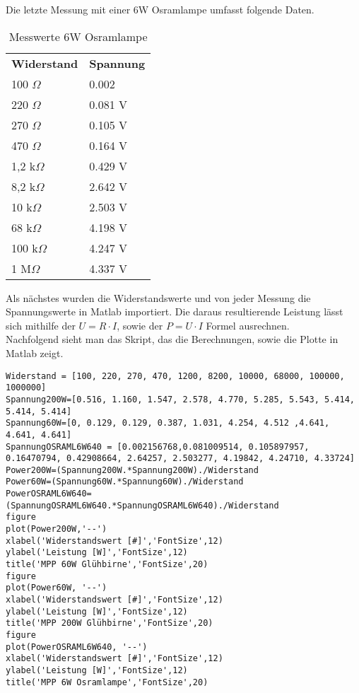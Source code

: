 Die letzte Messung mit einer 6W Osramlampe umfasst folgende Daten.
\begin{table}
\centering
\caption{Messwerte 6W Osramlampe}
\label{tab:Messwerte 6W Osramlampe}
\begin{tabular}{ll}
  \textbf{Widerstand} & \textbf{Spannung} \\
  100 $ \Omega $ & 0.002\\
  220 $ \Omega $ & 0.081 V\\
  270 $ \Omega $ & 0.105 V\\
  470 $ \Omega $ & 0.164 V\\
  1,2 k$ \Omega $ & 0.429 V\\
  8,2 k$ \Omega $ & 2.642 V \\
  10 k$ \Omega $ & 2.503 V \\
  68 k$ \Omega $ & 4.198 V \\
  100 k$ \Omega $ & 4.247 V \\
  1 M$ \Omega $ & 4.337 V \\
 \end{tabular}
\end{table}
 
Als nächstes wurden die Widerstandswerte und von jeder Messung die Spannungswerte in Matlab importiert. Die daraus resultierende Leistung lässt sich mithilfe der $U = R \cdot I$, sowie der $P = U \cdot I$ Formel ausrechnen.\\
Nachfolgend sieht man das Skript, das die Berechnungen, sowie die Plotte in Matlab zeigt.\\
\begin{lstlisting}
Widerstand = [100, 220, 270, 470, 1200, 8200, 10000, 68000, 100000, 1000000]
Spannung200W=[0.516, 1.160, 1.547, 2.578, 4.770, 5.285, 5.543, 5.414, 5.414, 5.414]
Spannung60W=[0, 0.129, 0.129, 0.387, 1.031, 4.254, 4.512 ,4.641, 4.641, 4.641]
SpannungOSRAML6W640 = [0.002156768,0.081009514, 0.105897957, 0.16470794, 0.42908664, 2.64257, 2.503277, 4.19842, 4.24710, 4.33724]
Power200W=(Spannung200W.*Spannung200W)./Widerstand
Power60W=(Spannung60W.*Spannung60W)./Widerstand
PowerOSRAML6W640=(SpannungOSRAML6W640.*SpannungOSRAML6W640)./Widerstand
figure
plot(Power200W,'--')
xlabel('Widerstandswert [#]','FontSize',12)
ylabel('Leistung [W]','FontSize',12)
title('MPP 60W Glühbirne','FontSize',20)
figure
plot(Power60W, '--')
xlabel('Widerstandswert [#]','FontSize',12)
ylabel('Leistung [W]','FontSize',12)
title('MPP 200W Glühbirne','FontSize',20)
figure
plot(PowerOSRAML6W640, '--')
xlabel('Widerstandswert [#]','FontSize',12)
ylabel('Leistung [W]','FontSize',12)
title('MPP 6W Osramlampe','FontSize',20)
\end{lstlisting}


